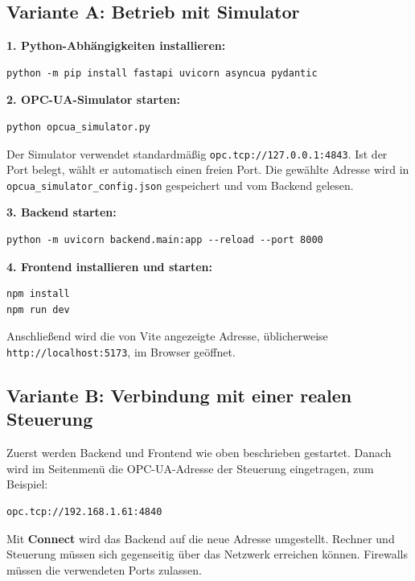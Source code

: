 \documentclass[11pt,a4paper,parskip=half]{scrartcl}
\newcommand{\code}[1]{\texttt{#1}}
\begin{document}
\subsection{Variante A: Betrieb mit Simulator}

\textbf{1. Python-Abhängigkeiten installieren:}

\begin{lstlisting}[style=terminal]
python -m pip install fastapi uvicorn asyncua pydantic
\end{lstlisting}

\textbf{2. OPC-UA-Simulator starten:}

\begin{lstlisting}[style=terminal]
python opcua_simulator.py
\end{lstlisting}

Der Simulator verwendet standardmäßig \code{opc.tcp://127.0.0.1:4843}. Ist der Port belegt, wählt er automatisch einen freien Port. Die gewählte Adresse wird in \code{opcua\_simulator\_config.json} gespeichert und vom Backend gelesen.

\textbf{3. Backend starten:}

\begin{lstlisting}[style=terminal]
python -m uvicorn backend.main:app --reload --port 8000
\end{lstlisting}

\textbf{4. Frontend installieren und starten:}

\begin{lstlisting}[style=terminal]
npm install
npm run dev
\end{lstlisting}

Anschließend wird die von Vite angezeigte Adresse, üblicherweise \code{http://localhost:5173}, im Browser geöffnet.

\subsection{Variante B: Verbindung mit einer realen Steuerung}

Zuerst werden Backend und Frontend wie oben beschrieben gestartet. Danach wird im Seitenmenü die OPC-UA-Adresse der Steuerung eingetragen, zum Beispiel:

\begin{lstlisting}[style=terminal]
opc.tcp://192.168.1.61:4840
\end{lstlisting}

Mit \textbf{Connect} wird das Backend auf die neue Adresse umgestellt. Rechner und Steuerung müssen sich gegenseitig über das Netzwerk erreichen können. Firewalls müssen die verwendeten Ports zulassen.
\end{document}
